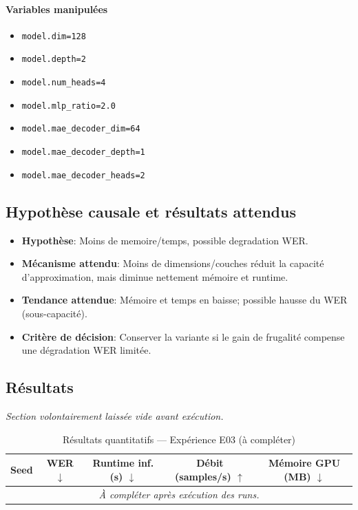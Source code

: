 \documentclass[11pt,a4paper]{article}
\begin{document}
\paragraph{Variables manipulées}
\begin{itemize}
\item \texttt{model.dim=128}
\item \texttt{model.depth=2}
\item \texttt{model.num\_heads=4}
\item \texttt{model.mlp\_ratio=2.0}
\item \texttt{model.mae\_decoder\_dim=64}
\item \texttt{model.mae\_decoder\_depth=1}
\item \texttt{model.mae\_decoder\_heads=2}
\end{itemize}

\subsection{Hypothèse causale et résultats attendus}
\begin{itemize}[leftmargin=1.2cm]
\item \textbf{Hypothèse}: Moins de memoire/temps, possible degradation WER.
\item \textbf{Mécanisme attendu}: Moins de dimensions/couches réduit la capacité d'approximation, mais diminue nettement mémoire et runtime.
\item \textbf{Tendance attendue}: Mémoire et temps en baisse; possible hausse du WER (sous-capacité).
\item \textbf{Critère de décision}: Conserver la variante si le gain de frugalité compense une dégradation WER limitée.
\end{itemize}

\subsection{Résultats}
\textit{Section volontairement laissée vide avant exécution.}

\begin{table}[H]
\centering
\caption{Résultats quantitatifs --- Expérience E03 (à compléter)}
\begin{tabular}{lcccc}
\toprule
Seed & WER $\downarrow$ & Runtime inf. (s) $\downarrow$ & Débit (samples/s) $\uparrow$ & Mémoire GPU (MB) $\downarrow$ \\
\midrule
\multicolumn{5}{c}{\textit{À compléter après exécution des runs.}} \\
\bottomrule
\end{tabular}
\end{table}
\end{document}
